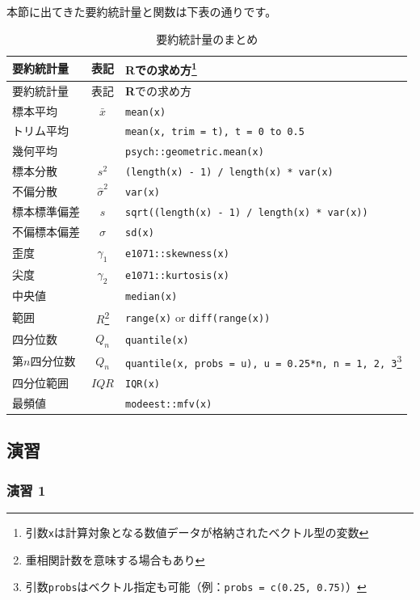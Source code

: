 \documentclass[
  12pt,
]{book}
\begin{document}
本節に出てきた要約統計量と関数は下表の通りです。

\begin{longtable}[]{@{}lcl@{}}
\caption{要約統計量のまとめ}\tabularnewline
\toprule
要約統計量 & 表記 & \textbf{R}での求め方\footnote{引数\texttt{x}は計算対象となる数値データが格納されたベクトル型の変数} \\
\midrule
\endfirsthead
\toprule
要約統計量 & 表記 & \textbf{R}での求め方{} \\
\midrule
\endhead
標本平均 & \(\bar{x}\) & \texttt{mean(x)} \\
トリム平均 & & \texttt{mean(x,\ trim\ =\ t),\ t\ =\ 0\ to\ 0.5} \\
幾何平均 & & \texttt{psych::geometric.mean(x)} \\
標本分散 & \(s^2\) & \texttt{(length(x)\ -\ 1)\ /\ length(x)\ *\ var(x)} \\
不偏分散 & \(\hat{\sigma}^2\) & \texttt{var(x)} \\
標本標準偏差 & \(s\) & \texttt{sqrt((length(x)\ -\ 1)\ /\ length(x)\ *\ var(x))} \\
不偏標本偏差 & \(\hat{\sigma}\) & \texttt{sd(x)} \\
歪度 & \(\gamma_1\) & \texttt{e1071::skewness(x)} \\
尖度 & \(\gamma_2\) & \texttt{e1071::kurtosis(x)} \\
中央値 & & \texttt{median(x)} \\
範囲 & \(R\)\footnote{重相関計数を意味する場合もあり} & \texttt{range(x)} or \texttt{diff(range(x))} \\
四分位数 & \(Q_n\) & \texttt{quantile(x)} \\
第\(n\)四分位数 & \(Q_n\) & \texttt{quantile(x,\ probs\ =\ u),\ u\ =\ 0.25*n,\ n\ =\ 1,\ 2,\ 3}\footnote{引数\texttt{probs}はベクトル指定も可能（例：\texttt{probs\ =\ c(0.25,\ 0.75)}）} \\
四分位範囲 & \(IQR\) & \texttt{IQR(x)} \\
最頻値 & & \texttt{modeest::mfv(x)} \\
\bottomrule
\end{longtable}

\newpage

\hypertarget{ux6f14ux7fd2}{%
\subsection{演習}\label{ux6f14ux7fd2}}

\hypertarget{ux6f14ux7fd2-1}{%
\subsubsection*{演習 1}\label{ux6f14ux7fd2-1}}
\end{document}
